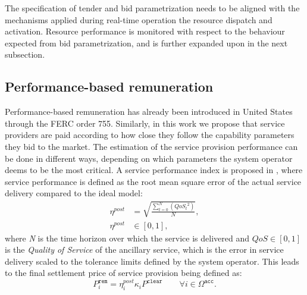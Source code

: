The specification of tender and bid parametrization needs to be aligned with the mechanisms applied during real-time operation the resource dispatch and activation.
Resource performance is monitored with respect to the behaviour expected from bid parametrization, and is further expanded upon in the next subsection.




\subsection{Performance-based remuneration}\label{subsec:performanceremuneration}


Performance-based remuneration has already been introduced in United States through the FERC order 755. Similarly, in this work we propose that service providers are paid according to how close they follow the capability parameters they bid to the market. The estimation of the service provision performance can be done in different ways, depending on which parameters the system operator deems to be the most critical. A service performance index is proposed in \cite{bondy2016method}, where service performance is defined as the root mean square error of the actual service delivery compared to the ideal model:
 \begin{align}
     \eta^{post} &= \sqrt{\frac{\sum^{N}_{t=0} \left( {QoS_{t}}^{2} \right)}{N}},\\
     \eta^{post} & \in [0,1],
 \end{align}
 where \emph{N} is the time horizon over which the service is delivered and $QoS \in [0,1]$ is the \emph{Quality of Service} of the ancillary service, which is the error in service delivery scaled to the tolerance limits defined by the system operator. This leads to the final settlement price of service provision being defined as:
\begin{equation}
    P^\mathtt{rem}_i = \eta^{post}_i\kappa_i  P^\mathtt{clear} \qquad \forall i \in \Omega^\mathtt{acc}.
\end{equation}
 

